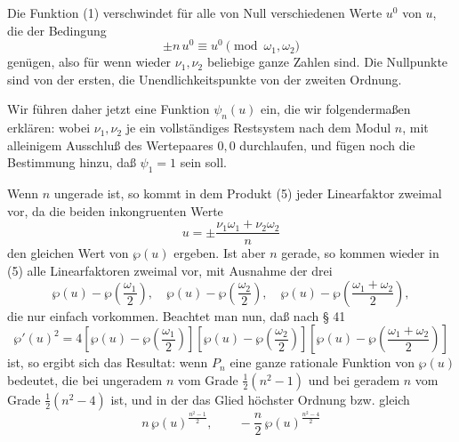 
Die Funktion (1) verschwindet für alle von Null verschiedenen Werte $u^0$
von $u$, die der Bedingung
\[
\pm n\,u^0 \equiv u^0 \pmod{\omega_1,\omega_2}
\]
genügen, also für
wenn wieder $\nu_1, \nu_2$ beliebige ganze Zahlen sind. Die Nullpunkte sind
von der ersten, die Unendlichkeitspunkte von der zweiten Ordnung.

Wir führen daher jetzt eine Funktion $\psi_n(u)$ ein, die wir
folgendermaßen erklären:
wobei $\nu_1, \nu_2$ je ein vollständiges Restsystem nach dem Modul $n$,
mit alleinigem Ausschluß des Wertepaares $0,0$ durchlaufen, und fügen noch
die Bestimmung hinzu, daß $\psi_1 = 1$ sein soll.

Wenn $n$ ungerade ist, so kommt in dem Produkt (5) jeder Linearfaktor
zweimal vor, da die beiden inkongruenten Werte
\[
u = \pm\frac{\nu_1\omega_1 + \nu_2\omega_2}{n}
\]
den gleichen Wert von $\wp(u)$ ergeben. Ist aber $n$ gerade, so kommen
wieder in (5) alle Linearfaktoren zweimal vor, mit Ausnahme der drei
\[
\wp(u) - \wp\left(\frac{\omega_1}{2}\right),\quad
\wp(u) - \wp\left(\frac{\omega_2}{2}\right),\quad
\wp(u) - \wp\left(\frac{\omega_1+\omega_2}{2}\right),
\]
die nur einfach vorkommen. Beachtet man nun, daß nach § 41
\[
\wp'(u)^2 = 4\left[\wp(u)-\wp\left(\frac{\omega_1}{2}\right)\right]\left[\wp(u)-\wp\left(\frac{\omega_2}{2}\right)\right]\left[\wp(u)-\wp\left(\frac{\omega_1+\omega_2}{2}\right)\right]
\]
ist, so ergibt sich das Resultat:
wenn $P_n$ eine ganze rationale Funktion von $\wp(u)$ bedeutet, die bei
ungeradem $n$ vom Grade $\frac12(n^2-1)$ und bei geradem $n$ vom Grade
$\frac12(n^2-4)$ ist, und in der das Glied höchster Ordnung bzw. gleich
\[
n\,\wp(u)^{\frac{n^2-1}{2}},\qquad -\frac{n}{2}\,\wp(u)^{\frac{n^2-4}{2}}
\]
